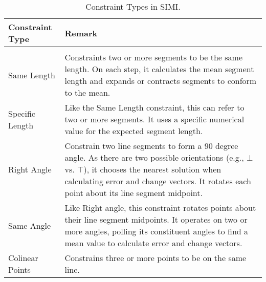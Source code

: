 \begin{table}
\centering
\begin{tabular}{l | p{12cm}}
\textbf{Constraint Type} &\textbf{Remark} \\
\hline
\\

Same Length &

Constraints two or more segments to be the same length. On each step,
it calculates the mean segment length and expands or contracts
segments to conform to the mean.

\\

Specific Length &

Like the Same Length constraint, this can refer to two or more
segments. It uses a specific numerical value for the expected segment
length.

\\

Right Angle &

Constrain two line segments to form a 90 degree angle. As there are
two possible orientations (e.g., $\bot$ vs. $\top$), it chooses the
nearest solution when calculating error and change vectors. It rotates
each point about its line segment midpoint.

\\

Same Angle &

Like Right angle, this constraint rotates points about their line
segment midpoints. It operates on two or more angles, polling its
constituent angles to find a mean value to calculate error and change
vectors.

\\

Colinear Points &

Constrains three or more points to be on the same line. 

\\ \hline
\end{tabular}
\caption[Constraint Types]{Constraint Types in SIMI.}
\label{tab:constraints}
\end{table}

